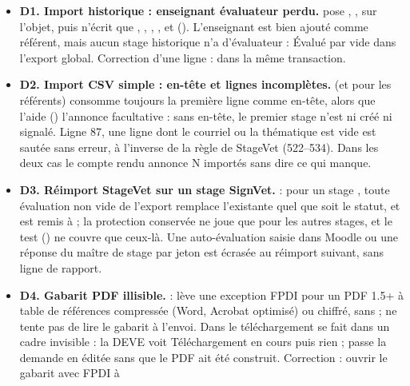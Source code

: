 \documentclass[11pt,a4paper]{article}
\newcommand{\grav}[1]{\textbf{\textcolor{#1}{\textbullet}}}
\newcommand{\maj}{\grav{orange}}
\begin{document}
\begin{itemize}
  \item[\maj] \textbf{D1. Import historique : enseignant évaluateur perdu.}
     pose , ,
     sur l'objet, puis  n'écrit que
    , , , ,
     et  (). L'enseignant est
    bien ajouté comme référent, mais aucun stage historique n'a d'évaluateur : \og Évalué par\fg{}
    vide dans l'export global. Correction d'une ligne :  dans la même transaction.
  \item[\maj] \textbf{D2. Import CSV simple : en-tête et lignes incomplètes.}
     (et  pour les référents) consomme toujours la
    première ligne comme en-tête, alors que l'aide () l'annonce
    facultative : sans en-tête, le premier stage n'est ni créé ni signalé. Ligne 87, une ligne
    dont le courriel ou la thématique est vide est sautée sans erreur, à l'inverse de la règle de
    StageVet (522--534). Dans les deux cas le compte rendu annonce \og N importés\fg{} sans dire
    ce qui manque.
  \item[\maj] \textbf{D3. Réimport StageVet sur un stage SignVet.}
     : pour un stage , toute évaluation non vide de
    l'export remplace l'existante quel que soit le statut, et  est remis à
     ; la protection \og conservée\fg{} ne joue que pour les autres stages, et le test
    () ne couvre que ceux-là. Une auto-évaluation saisie
    dans Moodle ou une réponse du maître de stage par jeton est écrasée au réimport suivant, sans
    ligne de rapport.
  \item[\maj] \textbf{D4. Gabarit PDF illisible.}  :
     lève une exception FPDI pour un PDF 1.5+ à table de références
    compressée (Word, Acrobat \og optimisé\fg{}) ou chiffré, sans  ;
     ne tente pas de lire le gabarit à l'envoi. Dans
     le téléchargement se fait dans un cadre invisible : la DEVE voit
    \og Téléchargement en cours\fg{} puis rien ;  passe la demande en
    \og éditée\fg{} sans que le PDF ait été construit. Correction : ouvrir le gabarit avec FPDI à

\end{itemize}
\end{document}
